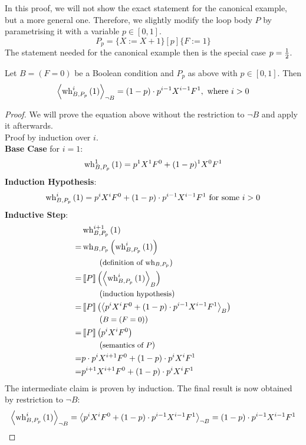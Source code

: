 In this proof, we will not show the exact statement for the canonical example, but a more general one.
Therefore, we slightly modify the loop body $P$ by parametrising it with a variable $p\in [0, 1]$.
\[ P_p = \{ X := X + 1 \}[p]\{ F := 1 \} \]
The statement needed for the canonical example then is the special case $p = \frac{1}{2}$.
\begin{lemma}
	Let $B = (F = 0)$ be a Boolean condition and $P_p$ as above with $p \in [0, 1]$.
	Then
	\[ \left\langle \operatorname{wh}_{B, P_p}^i\left(1\right) \right\rangle_{\lnot B}
		= (1-p) \cdot p^{i-1} X^{i-1} F^1 , \text{ where } i > 0 \]
	\begin{proof}
		We will prove the equation above without the restriction to $\lnot B$ and apply it afterwards. \\
		Proof by induction over $i$. \\
		\textbf{Base Case} for $i = 1$: \\
		\[ \operatorname{wh}_{B, P_p}^1\left(1\right)
			= p^1 X^1 F^0 + (1-p)^1 X^0 F^1 \]
		\textbf{Induction Hypothesis}:
		\[ \operatorname{wh}_{B, P_p}^i\left(1\right)
			= p^i X^i F^0 + (1-p) \cdot p^{i-1} X^{i-1} F^1 \text{ for some } i > 0 \]
		\textbf{Inductive Step}:
		\begin{align*}
			 & \operatorname{wh}_{B, P_p}^{i + 1}\left(1\right) \\
			=& \operatorname{wh}_{B, P_p}\left(
				\operatorname{wh}_{B, P_p}^i\left(1 \right) \right) \\
			 & \hspace*{2em} \left(\text{\small definition of $\operatorname{wh}_{B, P_p}$}\right) \\
			=& \left\llbracket P \right\rrbracket\left( \left\langle  \operatorname{wh}_{B, P_p}^i\left(1\right)  \right\rangle_{B} \right) \\
			 & \hspace*{2em} \left(\text{\small induction hypothesis}\right) \\
			=& \left\llbracket P \right\rrbracket\left( \left\langle p^i X^i F^0 + (1-p) \cdot p^{i-1} X^{i-1} F^1 \right\rangle_{B} \right) \\
			 & \hspace*{2em} \left(\text{\small $B = (F = 0)$}\right) \\
			=& \left\llbracket P \right\rrbracket\left( p^i X^i F^0 \right) \\
			 & \hspace*{2em} \left(\text{\small semantics of $P$}\right) \\
			=& p \cdot p^i X^{i+1} F^0 + (1-p) \cdot p^i X^i F^1 \\
			=& p^{i+1} X^{i+1} F^0 + (1-p) \cdot p^i X^i F^1
		\end{align*}
		The intermediate claim is proven by induction.
		The final result is now obtained by restriction to $\lnot B$:
		\[ \left\langle \operatorname{wh}_{B, P_p}^i\left(1\right) \right\rangle_{\lnot B}
			= \left\langle p^i X^i F^0 + (1-p) \cdot p^{i-1} X^{i-1} F^1 \right\rangle_{\lnot B}
			= (1-p) \cdot p^{i-1} X^{i-1} F^1		\qedhere \]
	\end{proof}
\end{lemma}
